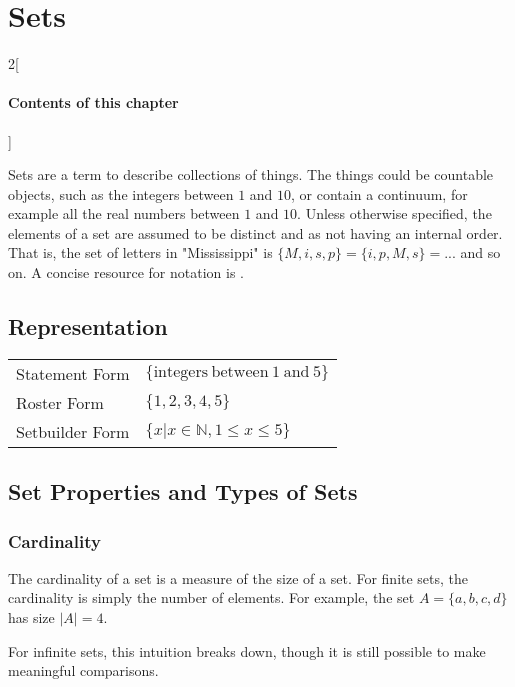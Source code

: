 \chapter{Sets}

\begin{multicols}{2}[\subsubsection*{Contents of this chapter}]
\end{multicols}



Sets are a term to describe collections of things. The things could be countable objects, such as the integers between $1$ and $10$, or contain a continuum, for example all the real numbers between $1$ and $10$. Unless otherwise specified, the elements of a set are assumed to be distinct and as not having an internal order. That is, the set of letters in "Mississippi" is $\{M,i,s,p \} = \{i,p,M,s \} = ... $ and so on. A concise resource for notation is . 


\section{Representation}

\begin{tabular}{ll}
Statement Form & $\{\mathrm{integers\ between\ 1\ and\ 5}\}$\\
Roster Form & $\{1,2,3,4,5\}$ \\
Setbuilder Form & $\{x|x\in\mathbb{N}, 1\leq x \leq 5 \} $
\end{tabular}


\section{Set Properties and Types of Sets}

\subsection{Cardinality}
The cardinality of a set is a measure of the size of a set. For finite sets, the cardinality is simply the number of elements. For example, the set  $A = \{a,b,c,d\}$ has size $|A|=4$.

For infinite sets, this intuition breaks down, though it is still possible to make meaningful comparisons. 

